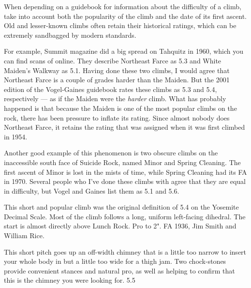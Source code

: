 \documentclass{tahquitz}
\begin{document}
When depending on a guidebook for information about the difficulty of a climb, take
into account both the popularity of the climb and the date of its first ascent.
Old and lesser-known climbs often retain their historical ratings, which can be
extremely sandbagged by modern standards.

For example,
Summit magazine did a big spread on Tahquitz in 1960, which you can find scans of online.
They describe Northeast Farce as 5.3 and White Maiden's Walkway as 5.1. Having done
these two climbs, I would agree that Northeast Farce is a couple of grades harder
than the Maiden. But the 2001 edition
of the Vogel-Gaines guidebook rates these climbs as 5.3 and 5.4, respectively --- as if
the Maiden were the \emph{harder} climb. What has
probably happened is that because the Maiden is one of the most popular climbs on
the rock, there has been pressure to inflate its rating. Since almost nobody does Northeast
Farce, it retains the rating that was assigned when it was first climbed in 1954.

Another good example of this phenomenon is two obscure climbs on the inaccessible
south face of Suicide Rock, named Minor and Spring Cleaning. The first ascent of Minor is
lost in the mists of time, while Spring Cleaning had its FA in 1970. Several people who
I've done these climbs with agree that they are equal in difficulty, but Vogel and Gaines
list them as 5.1 and 5.6.


\normalparindent





This short and popular climb was the original definition of 5.4 on the Yosemite Decimal Scale.
Most of the climb follows a long, uniform left-facing dihedral.
The start is almost directly above Lunch Rock. Pro to 2". FA
1936, Jim Smith and William Rice.

 This short pitch goes up an off-width chimney that is a little too
narrow to insert your whole body in but a little too wide for a thigh jam.
Two chock-stones provide convenient stances and natural pro, as well as helping
to confirm that this is the chimney you were looking for. 5.5
\end{document}
